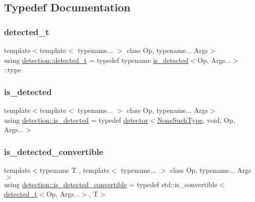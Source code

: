 \subsection{Typedef Documentation}
\mbox{\label{namespacedetection_a25bd8500c8667f0015e88f9d26cca271}} 
\subsubsection{\texorpdfstring{detected\+\_\+t}{detected\_t}}
{\footnotesize\ttfamily template$<$template$<$ typename... $>$ class Op, typename... Args$>$ \\
using \hyperlink{namespacedetection_a25bd8500c8667f0015e88f9d26cca271}{detection\+::detected\+\_\+t} = typedef typename \hyperlink{namespacedetection_a30893549a3de1e9603d78dad6d5dce92}{is\+\_\+detected}$<$Op, Args...$>$\+::type}

\mbox{\label{namespacedetection_a30893549a3de1e9603d78dad6d5dce92}} 
\subsubsection{\texorpdfstring{is\+\_\+detected}{is\_detected}}
{\footnotesize\ttfamily template$<$template$<$ typename... $>$ class Op, typename... Args$>$ \\
using \hyperlink{namespacedetection_a30893549a3de1e9603d78dad6d5dce92}{detection\+::is\+\_\+detected} = typedef \hyperlink{structdetection_1_1detector}{detector}$<$\hyperlink{namespacedetection_a08288d9ae2ffab86bb82bbdd27fbf77b}{None\+Such\+Type}, void, Op, Args...$>$}

\mbox{\label{namespacedetection_afb970b23e39cfecb33449d40242c49ff}} 
\subsubsection{\texorpdfstring{is\+\_\+detected\+\_\+convertible}{is\_detected\_convertible}}
{\footnotesize\ttfamily template$<$typename T , template$<$ typename... $>$ class Op, typename... Args$>$ \\
using \hyperlink{namespacedetection_afb970b23e39cfecb33449d40242c49ff}{detection\+::is\+\_\+detected\+\_\+convertible} = typedef std\+::is\+\_\+convertible$<$\hyperlink{namespacedetection_a25bd8500c8667f0015e88f9d26cca271}{detected\+\_\+t}$<$Op, Args...$>$, T$>$}

